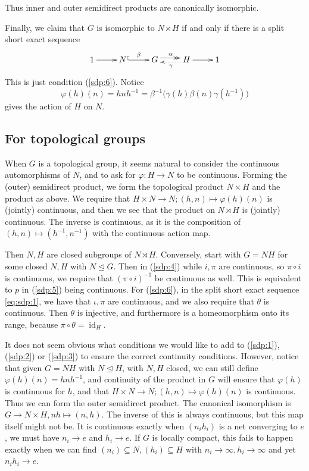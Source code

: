 \documentclass[twoside,a4paper,12pt]{article}
\theoremstyle{plain}
\theoremstyle{definition}
\newcommand{\id}{\operatorname{id}}
\begin{document}
Thus inner and outer semidirect products are canonically isomorphic.

Finally, we claim that $G$ is isomorphic to $N \rtimes H$ if and only if there is a split short exact
sequence
\[ \xymatrix{ 1 \ar[r] & N \ar@{^{(}->}[r]^{\beta} & G
\ar@{->>}@<0.6ex>[r]^{\alpha} & H \ar[r] \ar@{..>}@<0.6ex>[l]^{\gamma} & 1 } \]
This is just condition (\ref{sdp:6}).  Notice 
\[ \varphi(h)(n) = hnh^{-1} = \beta^{-1}\big( \gamma(h) \beta(n) \gamma(h^{-1}) \big) \]
gives the action of $H$ on $N$.


\subsection{For topological groups}

When $G$ is a topological group, it seems natural to consider the continuous automorphisms of $N$,
and to ask for $\varphi:H\rightarrow N$ to be continuous.  Forming the (outer) semidirect product, we
form the topological product $N \times H$ and the product as above.  We require that $H\times N
\rightarrow N; (h,n) \mapsto \varphi(h)(n)$ is (jointly) continuous, and then we see that the
product on $N \rtimes H$ is (jointly) continuous.  The inverse is continuous, as it is the composition
of $(h,n) \mapsto (h^{-1}, n^{-1})$ with the continuous action map.

Then $N, H$ are closed subgroups of $N\rtimes H$.  Conversely, start with $G=NH$ for some closed
$N,H$ with $N \unlhd G$.  Then in (\ref{sdp:4}) while $i,\pi$ are continuous, so $\pi\circ i$ is continuous,
we require that $(\pi\circ i)^{-1}$ be continuous as well.  This is equivalent to $p$ in (\ref{sdp:5})
being continuous.  For (\ref{sdp:6}), in the split short exact sequence \eqref{eq:sdp:1}, we have that
$\iota,\pi$ are continuous, and we also require that $\theta$ is continuous.  Then $\theta$ is injective,
and furthermore is a homeomorphism onto its range, because $\pi\circ\theta=\id_H$.

It does not seem obvious what conditions we would like to add to (\ref{sdp:1}), (\ref{sdp:2}) or (\ref{sdp:3})
to ensure the correct continuity conditions.  However, notice that given $G=NH$ with $N\unlhd H$, with
$N, H$ closed, we can still define $\varphi(h)(n) = hnh^{-1}$, and continuity of the product in $G$ will
ensure that $\varphi(h)$ is continuous for $h$, and that $H\times N \rightarrow N;
(h,n) \mapsto \varphi(h)(n)$ is continuous.  Thus we can form the outer semidirect product.  The canonical
isomorphism is $G \rightarrow N \times H, nh \mapsto (n,h)$.  The inverse of this is always continuous,
but this map itself might not be.  It is continuous exactly when $(n_i h_i)$ is a net converging to
$e$, we must have $n_i\rightarrow e$ and $h_i\rightarrow e$.  If $G$ is locally compact, this fails to
happen exactly when we can find $(n_i) \subseteq N, (h_i)\subseteq H$ with $n_i\rightarrow \infty,
h_i\rightarrow\infty$ and yet $n_ih_i\rightarrow e$.
\end{document}
